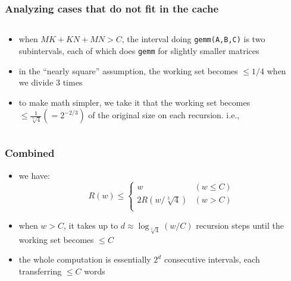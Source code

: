\documentclass[12pt,dvipdfmx]{beamer}
\newcommand{\ao}[1]{{\color{blue}#1}}
\begin{document}
\begin{frame}
\frametitle{Analyzing cases that do not fit in the cache}

\begin{columns}[t]
\begin{column}{0.6\textwidth}
\begin{itemize}
\item<1-> when $MK+KN+MN > C$, the interval doing
  {\tt gemm(A,B,C)} is two subintervals, 
  each of which does \texttt{gemm} for slightly smaller matrices

\item<2-> in the ``nearly square'' assumption, 
  the working set becomes $\leq 1/4$ when we divide 3
  times

\item<3-> to make math simpler, we take it that
  the working set becomes 
  ${\displaystyle \leq \frac{1}{\sqrt[3]{4}}} (= 2^{-2/3})$ of the
  original size on each recursion. i.e.,
\end{itemize}
\end{column}

\begin{column}{0.4\textwidth}
\begin{center}
\def\svgwidth{0.8\textwidth}
{\tiny }
\end{center}
\end{column}
\end{columns}

\only<4->{
\[ \therefore \ao{R(w) \leq 2 R(w / \sqrt[3]{4}) \quad (w > C)} \]
}
\end{frame}

\begin{frame}
\frametitle{Combined}
\begin{itemize}
\item we have:
\begin{equation*}
R(w) \leq \left\{
\begin{array}{ll}
w                   & (w \leq C) \\
2R(w / \sqrt[3]{4}) & (w > C) \\
\end{array}
\right.  
\end{equation*}

\item when $w > C$, it takes up to 
$d \approx \log_{\sqrt[3]{4}}(w/C)$
recursion steps until the working set becomes $\leq C$

\item the whole computation is essentially $2^d$
  consecutive intervals, each transferring $\leq C$ words
\end{itemize}
\end{frame}
\end{document}
